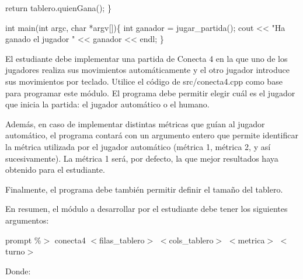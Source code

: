 \begin{DoxyCode}
    \textcolor{keywordflow}{return} tablero.quienGana();
\}

\textcolor{keywordtype}{int} main(\textcolor{keywordtype}{int} argc, \textcolor{keywordtype}{char} *argv[])\{
    \textcolor{keywordtype}{int} ganador = jugar\_partida();
    cout << \textcolor{stringliteral}{"Ha ganado el jugador "} << ganador << endl;
\}  
\end{DoxyCode}


El estudiante debe implementar una partida de Conecta 4 en la que uno de los jugadores realiza sus movimientos automáticamente y el otro jugador introduce sus movimientos por teclado. Utilice el código de {\ttfamily src/conecta4.\+cpp} como base para programar este módulo. El programa debe permitir elegir cuál es el jugador que inicia la partida\+: el jugador automático o el humano.

Además, en caso de implementar distintas métricas que guían al jugador automático, el programa contará con un argumento entero que permite identificar la métrica utilizada por el jugador automático (métrica 1, métrica 2, y así sucesivamente). La métrica 1 será, por defecto, la que mejor resultados haya obtenido para el estudiante.

Finalmente, el programa debe también permitir definir el tamaño del tablero.

En resumen, el módulo a desarrollar por el estudiante debe tener los siguientes argumentos\+:

{\ttfamily prompt \%$>$ conecta4 $<$filas\+\_\+tablero$>$ $<$cols\+\_\+tablero$>$ $<$metrica$>$ $<$turno$>$}

Donde\+:


